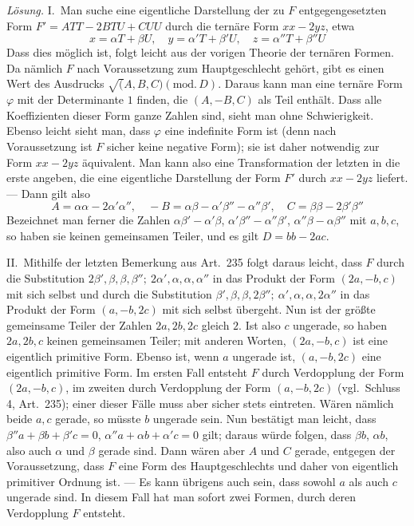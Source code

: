 \textit{Lösung.} I.\ Man suche eine eigentliche Darstellung der zu $F$
entgegengesetzten Form $F'=ATT-2BTU+CUU$ durch die ternäre Form $xx-2yz$, etwa
\[
x=\alpha T+\beta U,\quad y=\alpha'T+\beta'U,\quad z=\alpha''T+\beta''U
\]
Dass dies möglich ist, folgt leicht aus der vorigen Theorie der ternären
Formen. Da nämlich $F$ nach Voraussetzung zum Hauptgeschlecht gehört,
gibt es einen Wert des Ausdrucks $\surd(A,\allowbreak B,\allowbreak C)(\mathrm{mod.}\,\allowbreak D)$. Daraus kann man eine ternäre
Form $\varphi$ mit der Determinante $1$ finden, die $(A,-B,C)$ als Teil
enthält. Dass alle Koeffizienten dieser Form ganze Zahlen sind, sieht
man ohne Schwierigkeit. Ebenso leicht sieht man, dass $\varphi$ eine
indefinite Form ist (denn nach Voraussetzung ist $F$ sicher keine
negative Form); sie ist daher notwendig zur Form $xx-2yz$ äquivalent.
Man kann also eine Transformation der letzten in die erste angeben,
die eine eigentliche Darstellung der Form $F'$ durch $xx-2yz$ liefert.
--- Dann gilt also
\[
A=\alpha\alpha-2\alpha'\alpha'',\quad -B=\alpha\beta-\alpha'\beta''-\alpha''\beta',\quad C=\beta\beta-2\beta'\beta''
\]
Bezeichnet man ferner die Zahlen $\alpha\beta'-\alpha'\beta$, $\alpha'\beta''-\alpha''\beta'$, $\alpha''\beta-\alpha\beta''$ mit
$a,b,c$, so haben sie keinen gemeinsamen Teiler, und es gilt $D=bb-2ac$.

II.\ Mithilfe der letzten Bemerkung aus Art.\ 235 folgt daraus leicht,
dass $F$ durch die Substitution $2\beta',\allowbreak \beta,\allowbreak \beta,\allowbreak \beta'';\ 2\alpha',\allowbreak \alpha,\allowbreak \alpha,\allowbreak \alpha''$ in das Produkt der Form
$(2a,-b,c)$ mit sich selbst und durch die Substitution $\beta',\allowbreak \beta,\allowbreak \beta,\allowbreak 2\beta'';\ \alpha',\allowbreak \alpha,\allowbreak \alpha,\allowbreak 2\alpha''$ in das
Produkt der Form $(a,-b,2c)$ mit sich selbst übergeht. Nun ist der größte
gemeinsame Teiler der Zahlen $2a,2b,2c$ gleich $2$. Ist also $c$
ungerade, so haben $2a,2b,c$ keinen gemeinsamen Teiler; mit anderen Worten, $(2a,-b,c)$
ist eine eigentlich primitive Form. Ebenso ist, wenn $a$ ungerade
ist, $(a,-b,2c)$ eine eigentlich primitive Form. Im ersten Fall entsteht
$F$ durch Verdopplung der Form $(2a,-b,c)$, im zweiten durch Verdopplung
der Form $(a,-b,2c)$ (vgl.\ Schluss 4, Art.\ 235); einer dieser Fälle muss
aber sicher stets eintreten. Wären nämlich beide $a,c$ gerade,
so müsste $b$ ungerade sein. Nun bestätigt man leicht, dass
$\beta''a+\beta b+\beta'c=0$, $\alpha''a+\alpha b+\alpha'c=0$ gilt; daraus würde folgen, dass $\beta b$, $\alpha b$,
also auch $\alpha$ und $\beta$ gerade sind. Dann wären aber $A$
und $C$ gerade, entgegen der Voraussetzung, dass $F$ eine
Form des Hauptgeschlechts und daher von eigentlich primitiver Ordnung
ist. --- Es kann übrigens auch sein, dass sowohl $a$ als auch
$c$ ungerade sind. In diesem Fall hat man sofort zwei Formen,
durch deren Verdopplung $F$ entsteht.


